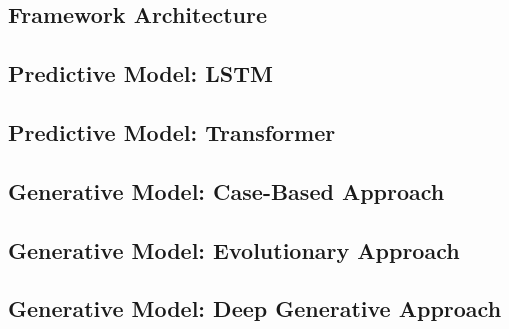 \documentclass[./../../paper.tex]{subfiles}
\begin{document}
\subsection{Framework Architecture}
\subsection{Predictive Model: LSTM}
\subsection{Predictive Model: Transformer }

\subsection{Generative Model: Case-Based Approach}
\subsection{Generative Model: Evolutionary Approach}
\subsection{Generative Model: Deep Generative Approach}
\end{document}
